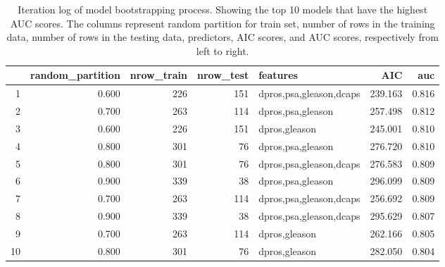 \documentclass[11pt]{article}\usepackage[]{graphicx}\usepackage[]{color}
\begin{document}
\begin{center}
\begin{table}[ht]
\centering
\begin{tabular}{rrrrlrr}
  \hline
 & random\_partition & nrow\_train & nrow\_test & features & AIC & auc \\ 
  \hline
1 & 0.600 &  226 &  151 & dpros,psa,gleason,dcaps & 239.163 & 0.816 \\ 
  2 & 0.700 &  263 &  114 & dpros,psa,gleason & 257.498 & 0.812 \\ 
  3 & 0.600 &  226 &  151 & dpros,gleason & 245.001 & 0.810 \\ 
  4 & 0.800 &  301 &   76 & dpros,psa,gleason & 276.720 & 0.810 \\ 
  5 & 0.800 &  301 &   76 & dpros,psa,gleason,dcaps & 276.583 & 0.809 \\ 
  6 & 0.900 &  339 &   38 & dpros,psa,gleason & 296.099 & 0.809 \\ 
  7 & 0.700 &  263 &  114 & dpros,psa,gleason,dcaps & 256.692 & 0.809 \\ 
  8 & 0.900 &  339 &   38 & dpros,psa,gleason,dcaps & 295.629 & 0.807 \\ 
  9 & 0.700 &  263 &  114 & dpros,gleason & 262.166 & 0.805 \\ 
  10 & 0.800 &  301 &   76 & dpros,gleason & 282.050 & 0.804 \\ 
   \hline
\end{tabular}
\caption{Iteration log of model bootstrapping process. Showing the top 10 models that have the highest AUC scores. The columns represent random partition for train set, number of rows in the training data, number of rows in the testing data, predictors, AIC scores, and AUC scores, respectively from left to right.} 
\label{reg_bootstrap}
\end{table}

\end{center}
\end{document}

